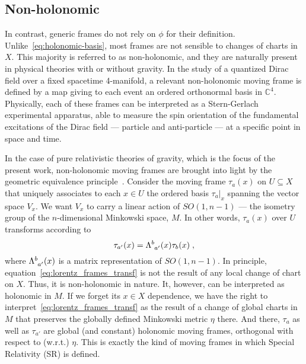 \documentclass[../../main.tex]{subfiles}
\begin{document}
\subsection{Non-holonomic}\label{ssec:non-holonomic}

In contrast, generic frames do not rely on $\phi$ for their definition. Unlike~\eqref{eq:holonomic-basis}, most frames are not sensible to changes of charts in $X$. This majority is referred to as non-holonomic, and they are naturally present in physical theories with or without gravity. In the study of a quantized Dirac field over a fixed spacetime 4-manifold, a relevant non-holonomic moving frame is defined by a map giving to each event an ordered orthonormal basis in $\mathbb{C}^4$. Physically, each of these frames can be interpreted as a Stern-Gerlach experimental apparatus, able to measure the spin orientation of the fundamental excitations of the Dirac field --- particle and anti-particle --- at a specific point in space and time.

In the case of pure relativistic theories of gravity, which is the focus of the present work, non-holonomic moving frames are brought into light by the geometric equivalence principle~\cite{ivanenko1983a,sardanashvily1994a,sardanashvily2016a}. Consider the moving frame $\tau_a(x)$ on $ U \subseteq X $ that uniquely associates to each $ x \in U $ the ordered basis $ \tau_a|_x $ spanning the vector space $ V_x $. We want $ V_x $ to carry a linear action of $ SO \left( 1, n-1 \right) $ --- the isometry group of the $n$-dimensional Minkowski space, $ M $. In other words, $ \tau_a(x) $ over $U$ transforms according to
\begin{equation}
  \label{eq:lorentz_frames_transf}
  {\tau}_{a'}(x) = \tensor{\Lambda}{^b_{a'}}(x)\tau_b(x) \;,
\end{equation}
where $\tensor{\Lambda}{^b_{a'}}(x)$ is a matrix representation of $SO(1,n-1)$. In principle, equation~\eqref{eq:lorentz_frames_transf} is not the result of any local change of chart on $X$. Thus, it is non-holonomic in nature. It, however, can be interpreted as holonomic in $M$. If we forget its $x\in X$ dependence, we have the right to interpret~\eqref{eq:lorentz_frames_transf} as the result of a change of global charts in $M$ that preserves the globally defined Minkowski metric $\eta$ there. And there, $\tau_a$ as well as $\tau_{a'}$ are global (and constant) holonomic moving frames, orthogonal with respect to (w.r.t.) $\eta$. This is exactly the kind of moving frames in which Special Relativity (SR) is defined.
\end{document}
